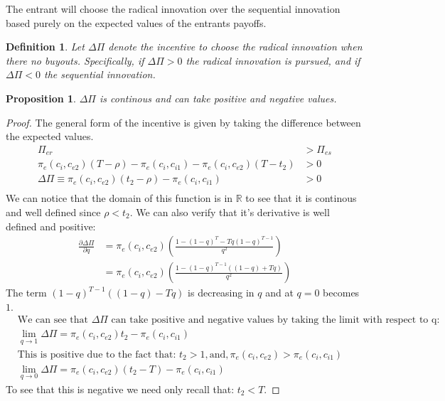 \documentclass[12pt]{report}
\newtheorem{proposition}{Proposition}
\newtheorem{definition}{Definition}
\numberwithin{equation}{section}
\begin{document}
The entrant will choose the radical innovation over the sequential innovation based purely on the expected values of the entrants payoffs.
\begin{definition}
Let $\Delta \Pi$ denote the incentive to choose the radical innovation when there no buyouts. Specifically, if $\Delta \Pi >0$ the radical innovation is pursued, and if $\Delta \Pi <0$ the sequential innovation. 
\end{definition}
\begin{proposition}
$\Delta \Pi$ is continous and can take positive and negative values. 
\end{proposition}
\begin{proof}
The general form of the incentive is given by taking the difference between the expected values. 
\begin{align*}
\Pi_{er}  &> \Pi_{es}   \\
\pi_{e}(c_i,c_{e2}) \left( T - \rho \right) - \pi_e(c_i,c_{i1})  -\pi_e(c_i,c_{e2})(T-t_2) &> 0 \\
\Delta \Pi \equiv \pi_{e}(c_i,c_{e2}) \left( t_2 - \rho \right) - \pi_e(c_i,c_{i1})  &> 0 \\
\end{align*}
We can notice that the domain of this function is in $\mathbb{R}$ to see that it is continous and well defined since $\rho < t_2 $. We can also verify that it's derivative is well defined and positive: 
\begin{align*}
\frac{\partial \Delta \Pi}{\partial q} &= \pi_{e}(c_i,c_{e2})  \left(\frac{1-(1-q)^T-T q (1-q)^{T-1}}{q^2} \right) \\
& = \pi_{e}(c_i,c_{e2})  \left(\frac{1-(1-q)^{T-1}((1-q)+T q) }{q^2} \right) 
\end{align*}
The term $(1-q)^{T-1}((1-q)-T q)$ is decreasing in $q$ and at $q=0$  becomes $1$. 
\begin{align*}
&\text{We can see that } \Delta \Pi \text{ can take positive and negative values by taking the limit with respect to q:} \\
&\lim_{q \to 1}\Delta \Pi = \pi_{e}(c_i,c_{e2}) t_2  - \pi_e(c_i,c_{i1}) \\
& \text{This is positive due to the fact that: } t_2>1, \text{and}, \pi_{e}(c_i,c_{e2})>\pi_e(c_i,c_{i1}) \\
&\lim_{q \to 0}\Delta \Pi = \pi_{e}(c_i,c_{e2}) (t_2 - T)- \pi_e(c_i,c_{i1}) 
\end{align*}  
To see that this is negative we need only recall that: $t_2<T$.
\end{proof}
\end{document}
